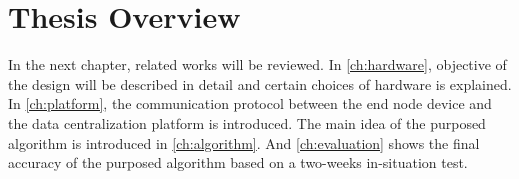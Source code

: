 \section{Thesis Overview}
In the next chapter, related works will be reviewed. In \autoref{ch:hardware}, objective of the design will be described in detail and certain choices of hardware is explained. In \autoref{ch:platform}, the communication protocol between the end node device and the data centralization platform is introduced. The main idea of the purposed algorithm is introduced in \autoref{ch:algorithm}. And \autoref{ch:evaluation} shows the final accuracy of the purposed algorithm based on a two-weeks in-situation test.







